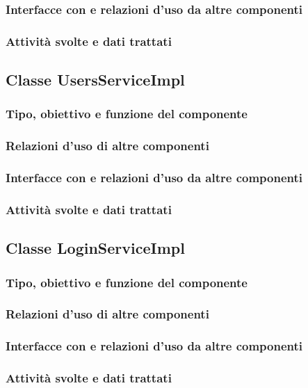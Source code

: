 \subsubsection*{Interfacce con e relazioni d'uso da altre componenti}
\subsubsection*{Attivit\`a svolte e dati trattati}

\subsection{Classe UsersServiceImpl}
\subsubsection*{Tipo, obiettivo e funzione del componente}
\subsubsection*{Relazioni d'uso di altre componenti}
\subsubsection*{Interfacce con e relazioni d'uso da altre componenti}
\subsubsection*{Attivit\`a svolte e dati trattati}

\subsection{Classe LoginServiceImpl}
\subsubsection*{Tipo, obiettivo e funzione del componente}
\subsubsection*{Relazioni d'uso di altre componenti}
\subsubsection*{Interfacce con e relazioni d'uso da altre componenti}
\subsubsection*{Attivit\`a svolte e dati trattati}

